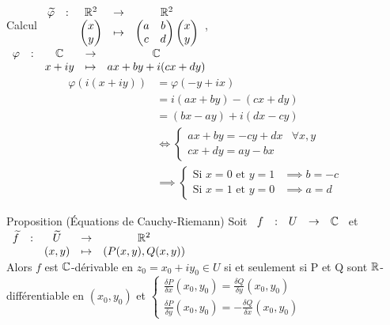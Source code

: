 \documentclass[]{report}
\begin{document}
\begin{re}{Calcul}{}
$\begin{array}{ccccc}
\widetilde{\varphi} & : & \mathbb{R}^2 & \to & \mathbb{R}^2 \\
 & & \begin{pmatrix}
x \\
y
\end{pmatrix} & \mapsto & \begin{pmatrix}
a & b \\
c & d
\end{pmatrix}\begin{pmatrix}
x \\
y
\end{pmatrix} \\
\end{array}$, $\begin{array}{ccccc}
\varphi & : & \mathbb{C} & \to & \mathbb{C} \\
 & & x+iy & \mapsto & ax+by+i(cx+dy) \\
\end{array}$\\
\begin{align*}
\varphi(i(x+iy)) & =\varphi(-y+ix)\\
 &=i(ax+by)-(cx+dy) \\
&=(bx-ay)+i(dx-cy) \\
& \iff \begin{cases} ax+by=-cy+dx & \forall x,y\\ cx+dy=ay-bx \end{cases} \\
& \implies \begin{cases} \text{Si } x=0 \text{ et } y=1  & \implies b=-c \\ \text{Si } x=1 \text{ et } y=0  & \implies a=d  \end{cases}
\end{align*}
\end{re}

\begin{prop}{Proposition (Équations de Cauchy-Riemann)}{}
    Soit $\begin{array}{ccccc}f & : & U & \to & \mathbb{C}\end{array}$ et $\begin{array}{ccccc}
\widetilde{f} & : & \widetilde{U} & \to & \mathbb{R}^2 \\
 & & (x,y) & \mapsto & (P(x,y),Q(x,y)) \\
\end{array}$ \\
Alors $f$ est $\mathbb{C}$-dérivable en $z_0=x_0+iy_0 \in U$ si et seulement si P et Q sont $\mathbb{R}$-différentiable en $(x_0,y_0)$ et $\begin{cases} \frac{\delta P}{\delta x}(x_0,y_0)=\frac{\delta Q}{\delta y}(x_0,y_0)\\ \frac{\delta P}{\delta y}(x_0,y_0)=-\frac{\delta Q}{\delta x}(x_0,y_0) \end{cases}$
\end{prop}
\end{document}
